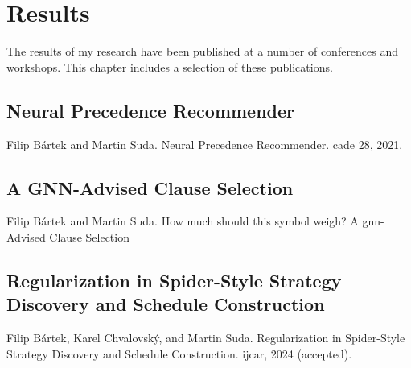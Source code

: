 \chapter{Results}

The results of my research have been published at a number of conferences and workshops.
This chapter includes a selection of these publications.

%


\section{Neural Precedence Recommender}
\label{sec:results:npr}

Filip Bártek and Martin Suda. Neural Precedence Recommender. \Gls{cade} 28, 2021. \cite{DBLP:conf/cade/Bartek021}



\section{A GNN-Advised Clause Selection}
\label{sec:results:gnn}

Filip Bártek and Martin Suda. How much should this symbol weigh? A \acrshort{gnn}-Advised Clause Selection \cite{DBLP:conf/lpar/Bartek023}



\section{Regularization in Spider-Style Strategy Discovery and Schedule Construction}
\label{sec:results:regularization}

Filip Bártek, Karel Chvalovský, and Martin Suda. Regularization in Spider-Style Strategy Discovery and Schedule Construction. \Gls{ijcar}, 2024 (accepted). \cite{bartek2024regularization}


